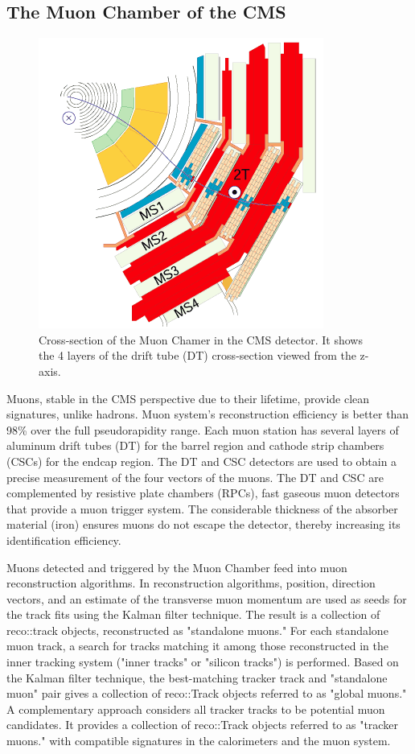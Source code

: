 \subsection{The Muon Chamber of the CMS}
\begin{figure}[h!]
	\caption{Cross-section of the Muon Chamer in the CMS detector. It shows the 4 layers of the drift tube (DT) cross-section viewed from the z-axis. \cite{det}}
  \label{fig:MC}
  \centering
  \includegraphics[width=0.4\linewidth]{figs/MCcms.png}
\end{figure}

Muons, stable in the CMS perspective due to their lifetime, provide clean signatures, unlike hadrons.
Muon system's reconstruction efficiency is better than 98\% over the full pseudorapidity range.
Each muon station has several layers of aluminum drift tubes (DT) for the barrel region and cathode strip chambers (CSCs) for the endcap region.
The DT and CSC detectors are used to obtain a precise measurement of the four vectors of the muons.
The DT and CSC are complemented by resistive plate chambers (RPCs), fast gaseous muon detectors that provide a muon trigger system.
The considerable thickness of the absorber material (iron) ensures muons do not escape the detector, thereby increasing its identification efficiency.

Muons detected and triggered by the Muon Chamber feed into muon reconstruction algorithms.
In reconstruction algorithms, position, direction vectors, and an estimate of the transverse muon momentum are used as seeds for the track fits using the Kalman filter technique.
The result is a collection of reco::track objects, reconstructed as "standalone muons."
For each standalone muon track, a search for tracks matching it among those reconstructed in the inner tracking system ("inner tracks" or "silicon tracks")  is performed.
Based on the Kalman filter technique, the best-matching tracker track and "standalone muon" pair gives a collection of reco::Track objects referred to as "global muons."
A complementary approach considers all tracker tracks to be potential muon candidates. 
It provides a collection of reco::Track objects referred to as "tracker muons."  with compatible signatures in the calorimeters and the muon system.

